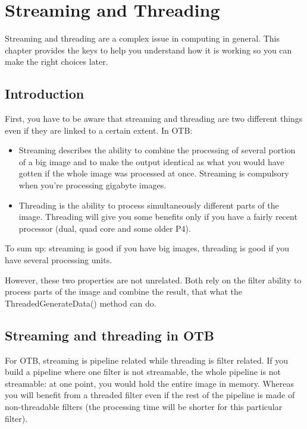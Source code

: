 \chapter{Streaming and Threading}
\label{sec:StreamingAndThreading}


Streaming and threading are a complex issue in computing in general. This
chapter provides the keys to help you understand how it is working so you can
make the right choices later.

\section{Introduction}

First, you have to be aware that streaming and threading are two different
things even if they are linked to a certain extent. In OTB:

\begin{itemize}
\item Streaming describes the ability to combine the processing of several
portion of a big image and to make the output identical as what you would have
gotten if the whole image was processed at once. Streaming is compulsory when
you're processing gigabyte images. 
\item Threading is the ability to process simultaneously different parts of the
image. Threading will give you some benefits only if you have a fairly recent
processor (dual, quad core and some older P4).
\end{itemize}



To sum up: streaming is good if you have big images, threading is good if you
have several processing units.

However, these two properties are not unrelated. Both rely on the filter ability
to process parts of the image and combine the result, that what the
ThreadedGenerateData() method can do.

\section{Streaming and threading in OTB}

For OTB, streaming is pipeline related while threading is filter related. If you
build a pipeline where one filter is not streamable, the whole pipeline is not
streamable: at one point, you would hold the entire image in memory. Whereas you
will benefit from a threaded filter even if the rest of the pipeline is made of
non-threadable filters (the processing time will be shorter for this particular
filter).


